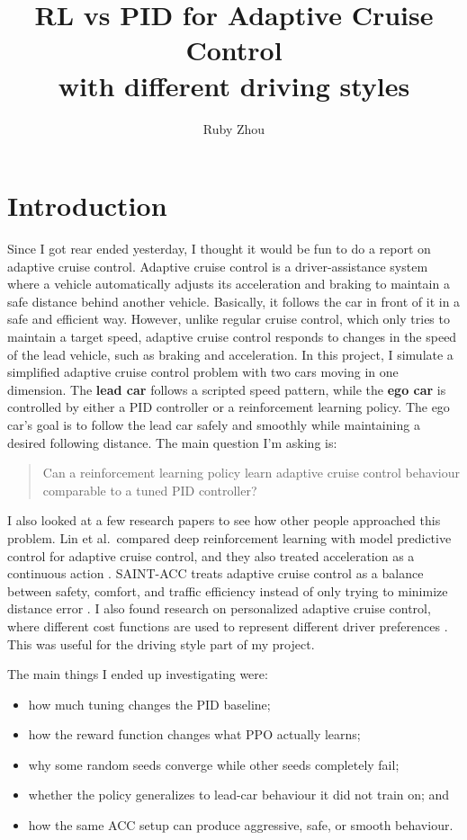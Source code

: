 \documentclass{article}
\title{RL vs PID for Adaptive Cruise Control\\
\large with different driving styles}
\author{Ruby Zhou}
\date{}
\begin{document}
\maketitle

\section{Introduction} Since I got rear ended yesterday, I thought it would be fun to do a report on adaptive cruise control. Adaptive cruise control is a driver-assistance system where a vehicle automatically adjusts its acceleration and braking to maintain a safe distance behind another vehicle. Basically, it follows the car in front of it in a safe and efficient way. However, unlike regular cruise control, which only tries to maintain a target speed, adaptive cruise control responds to changes in the speed of the lead vehicle, such as braking and acceleration. In this project, I simulate a simplified adaptive cruise control problem with two cars moving in one dimension. The \textbf{lead car} follows a scripted speed pattern, while the \textbf{ego car} is controlled by either a PID controller or a reinforcement learning policy. The ego car's goal is to follow the lead car safely and smoothly while maintaining a desired following distance. The main question I'm asking is: \begin{quote} Can a reinforcement learning policy learn adaptive cruise control behaviour comparable to a tuned PID controller? \end{quote} 

I also looked at a few research papers to see how other people approached this problem. Lin et al.\ compared deep reinforcement learning with model predictive control for adaptive cruise control, and they also treated acceleration as a continuous action \cite{lin2020comparison}. SAINT-ACC treats adaptive cruise control as a balance between safety, comfort, and traffic efficiency instead of only trying to minimize distance error \cite{das2021saint}. I also found research on personalized adaptive cruise control, where different cost functions are used to represent different driver preferences \cite{ozkan2021personalized}. This was useful for the driving style part of my project.

The main things I ended up investigating were:
\begin{itemize}
    \item how much tuning changes the PID baseline;
    \item how the reward function changes what PPO actually learns;
    \item why some random seeds converge while other seeds completely fail;
    \item whether the policy generalizes to lead-car behaviour it did not train on; and
    \item how the same ACC setup can produce aggressive, safe, or smooth behaviour.
\end{itemize}
\end{document}
